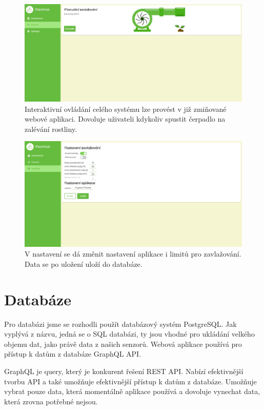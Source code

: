 \documentclass[11pt,a4paper]{article}
\begin{document}
\begin{figure}[h]
	\centering
	\includegraphics[width=\linewidth]{web-ui-pump.png}
	\caption*{Interaktivní ovládání celého systému lze provést v již zmiňované webové aplikaci. Dovoluje uživateli kdykoliv spustit čerpadlo na zalévání rostliny.}
\end{figure}

\begin{figure}[h]
	\centering
	\includegraphics[width=\linewidth]{web-ui-settings.png}
	\caption*{V nastavení se dá změnit nastavení aplikace i limitů pro zavlažování. Data se po uložení uloží do databáze.}
\end{figure}

\clearpage

\section*{Databáze}

Pro databázi jsme se rozhodli použít databázový systém PostgreSQL. Jak vyplývá z názvu, jedná se o SQL databázi, ty jsou vhodné pro ukládání velkého objemu dat, jako právě data z našich senzorů. Webová aplikace používá pro přístup k datům z databáze GraphQL API.

GraphQL je query, který je konkurent řešení REST API. Nabízí efektivnější tvorbu API a také umožňuje efektivnější přístup k datům z databáze. Umožňuje vybrat pouze data, která momentálně aplikace používá a dovoluje vynechat data, která zrovna potřebné nejsou.
\end{document}
